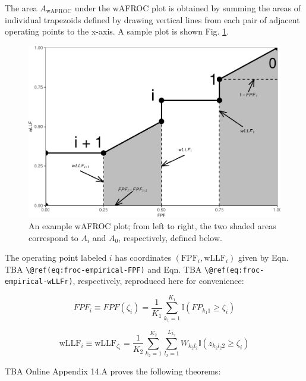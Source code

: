\documentclass[
]{book}
\begin{document}
The area \(A_{\text{wAFROC}}\) under the wAFROC plot is obtained by summing the areas of individual trapezoids defined by drawing vertical lines from each pair of adjacent operating points to the x-axis. A sample plot is shown Fig. \ref{fig:froc-meanings-theorems}.

\begin{figure}
\centering
\includegraphics{14-meanings-foms_files/figure-latex/froc-meanings-theorems-1.pdf}
\caption{\label{fig:froc-meanings-theorems}An example wAFROC plot; from left to right, the two shaded areas correspond to \(A_i\) and \(A_0\), respectively, defined below.}
\end{figure}

The operating point labeled \(i\) has coordinates \(\left ( \text{FPF}_i, \text{wLLF}_i \right )\) given by Eqn. TBA \texttt{\textbackslash{}@ref(eq:froc-empirical-FPF)} and Eqn. TBA \texttt{\textbackslash{}@ref(eq:froc-empirical-wLLFr)}, respectively, reproduced here for convenience:

\begin{equation}
FPF_i \equiv FPF \left ( \zeta_i \right ) = \frac{1}{K_1} \sum_{k_1=1}^{K_1} \mathbb{I} \left ( FP_{k_1 1} \geq \zeta_i\right )
\label{eq:froc-meanings-FPF}
\end{equation}

\begin{equation}
\text{wLLF}_i \equiv \text{wLLF}_{\zeta_i} = \frac{1}{K_2}\sum_{k_2=1}^{K_2}\sum_{l_2=1}^{L_{k_2}}W_{k_2 l_2} \mathbb{I}\left ( z_{k_2 l_2 2} \geq \zeta_i \right )
\label{eq:froc-meanings-wLLFi}
\end{equation}

TBA Online Appendix 14.A proves the following theorems:
\end{document}
